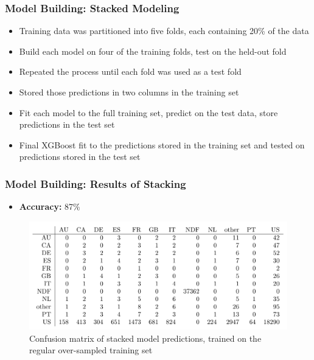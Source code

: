 \documentclass{beamer}
\begin{document}
\begin{frame}
\frametitle{Model Building: Stacked Modeling}
\begin{itemize}
  \item Training data was partitioned into five folds, each containing 20\% of the data
  \item Build each model on four of the training folds, test on the held-out fold
  \item Repeated the process until each fold was used as a test fold
  \item Stored those predictions in two columns in the training set
  \item Fit each model to the full training set, predict on the test data, store predictions in the test set
  \item Final XGBoost fit to the predictions stored in the training set and tested on predictions stored in the test set 
\end{itemize}
\end{frame}


\begin{frame}
\frametitle{Model Building: Results of Stacking}
\begin{itemize}
  \item \textbf{Accuracy:} 87\%
\end{itemize}
\begin{figure}
\includegraphics[width=1\linewidth]{stacked_confusion_m.png}
\caption{Confusion matrix of stacked model predictions, trained on the regular over-sampled training set}
\end{figure}
\end{frame}

\end{document}
